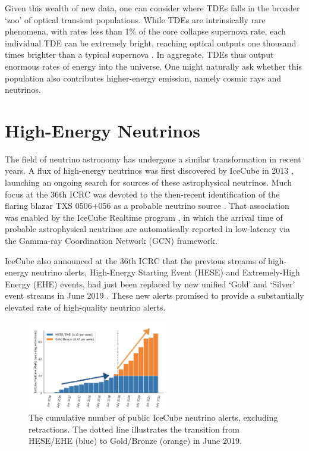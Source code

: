 \documentclass[a4paper,11pt]{article}
\begin{document}
Given this wealth of new data, one can consider where TDEs falls in the broader `zoo' of optical transient populations. 
While TDEs are intrinsically rare phenomena, with rates less than 1\% of the core collapse supernova rate, each individual TDE can be extremely bright, reaching optical outputs one thousand times brighter than a typical supernova \cite{fang_20}. In aggregate, TDEs thus output enormous rates of energy into the universe. One might naturally ask whether this population also contributes higher-energy emission, namely cosmic rays and neutrinos.

\section{High-Energy Neutrinos}

The field of neutrino astronomy has undergone a similar transformation in recent years. A flux of high-energy neutrinos was first discovered by IceCube in 2013 \cite{ic_astro_13}, launching an ongoing search for sources of these astrophysical neutrinos. Much focus at the 36th ICRC was devoted to the then-recent identification of the flaring blazar TXS 0506+056 as a probable neutrino source \cite{ic_txs_mm_18, kappes_19}. That association was enabled by the IceCube Realtime program \cite{ic_realtime_17}, in which the arrival time of probable astrophysical neutrinos are automatically reported in low-latency via the Gamma-ray Coordination Network (GCN) framework.

IceCube also announced at the 36th ICRC that the previous streams of high-energy neutrino alerts, High-Energy Starting Event (HESE) and Extremely-High Energy (EHE)  events, had just been replaced by new unified `Gold' and `Silver' event streams in June 2019 \cite{ic_realtime_19}. These new alerts promised to provide a substantially elevated rate of high-quality neutrino alerts. 

\begin{figure}[!ht]
	\centering \includegraphics[width=0.55\textwidth]{figures/ic_alerts}
	\caption{The cumulative number of public IceCube neutrino alerts, excluding retractions. The dotted line illustrates the transition from HESE/EHE (blue) to Gold/Bronze (orange) in June 2019.}
	\label{fig:ic_alerts}
\end{figure}
\end{document}
